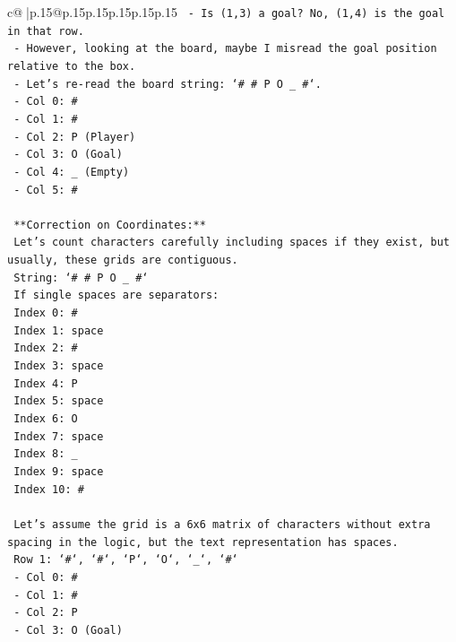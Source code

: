 \documentclass{article}
\begin{document}
{\begin{supertabular}{c@{$\;$}|p{.15\linewidth}@{}p{.15\linewidth}p{.15\linewidth}p{.15\linewidth}p{.15\linewidth}p{.15\linewidth}}
{{{\texttt{   {-} Is (1,3) a goal? No, (1,4) is the goal in that row.} \\
\texttt{   {-} However, looking at the board, maybe I misread the goal position relative to the box.} \\
\texttt{   {-} Let's re{-}read the board string: `\# \# P O \_ \#`.} \\
\texttt{     {-} Col 0: \#} \\
\texttt{     {-} Col 1: \#} \\
\texttt{     {-} Col 2: P (Player)} \\
\texttt{     {-} Col 3: O (Goal)} \\
\texttt{     {-} Col 4: \_ (Empty)} \\
\texttt{     {-} Col 5: \#} \\
\\ 
\texttt{   **Correction on Coordinates:**} \\
\texttt{   Let's count characters carefully including spaces if they exist, but usually, these grids are contiguous.} \\
\texttt{   String: `\# \# P O \_ \#`} \\
\texttt{   If single spaces are separators:} \\
\texttt{   Index 0: \#} \\
\texttt{   Index 1: space} \\
\texttt{   Index 2: \#} \\
\texttt{   Index 3: space} \\
\texttt{   Index 4: P} \\
\texttt{   Index 5: space} \\
\texttt{   Index 6: O} \\
\texttt{   Index 7: space} \\
\texttt{   Index 8: \_} \\
\texttt{   Index 9: space} \\
\texttt{   Index 10: \#} \\
\\ 
\texttt{   Let's assume the grid is a 6x6 matrix of characters without extra spacing in the logic, but the text representation has spaces.} \\
\texttt{   Row 1: `\#`, `\#`, `P`, `O`, `\_`, `\#`} \\
\texttt{   {-} Col 0: \#} \\
\texttt{   {-} Col 1: \#} \\
\texttt{   {-} Col 2: P} \\
\texttt{   {-} Col 3: O (Goal)} \\
}}}
\end{supertabular}}
\end{document}
